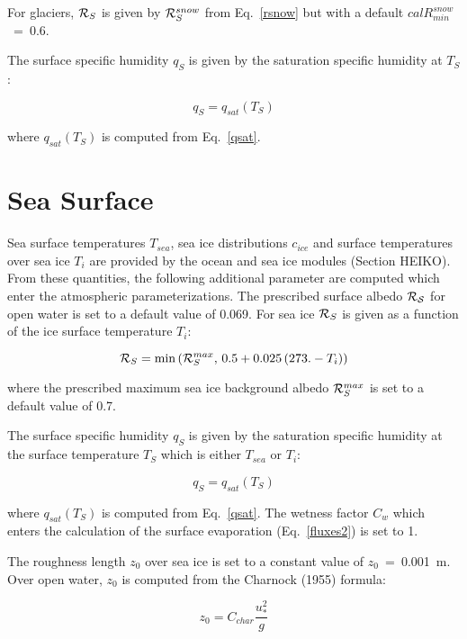 For glaciers, ${\cal R}_S$ is given by ${\cal R}_S^{snow}$ from Eq.~\ref{rsnow} but with a
default 
${cal R}_{min}^{snow}$~=~0.6.

The surface specific humidity $q_S$ is given by the saturation specific humidity at $T_S$:

\begin{equation}
q_S =q_{sat}(T_S)
\end{equation}

where $q_{sat}(T_S)$ is computed from
Eq.~\ref{qsat}. 

\section{Sea Surface}\label{seasurf}

Sea surface temperatures $T_{sea}$, sea  ice distributions
$c_{ice}$ and surface temperatures over
sea ice $T_i$ are provided by the ocean and sea
ice modules (Section HEIKO). From
these quantities, the following additional parameter are
computed which enter the atmospheric
parameterizations. The prescribed surface albedo ${\cal R_S}$
for open water is set to a default value of
0.069. For sea ice ${\cal R}_S$  is given as a function of the ice
surface temperature $T_{i}$:

\begin{equation}
{\cal R}_S=\min{({\cal R}_S^{max}, \, 0.5 + 0.025 \, (273. - T_{i}))} 
\end{equation} 

where the prescribed maximum sea ice background
albedo ${\cal R}_S^{max}$ is set to a default value
of  0.7. 

The surface
specific humidity $q_S$ is given by the
saturation specific humidity at the surface
temperature $T_S$ which is either $T_{sea}$ or
$T_{i}$:

\begin{equation}
q_S =q_{sat}(T_S)
\end{equation}

where $q_{sat}(T_S)$ is computed from
Eq.~\ref{qsat}.  The wetness factor $C_w$ which
enters
the calculation of the surface evaporation
(Eq.~\ref{fluxes2}) is set to 1. 
 
The roughness length $z_0$  over sea ice is set to a
constant value of  $z_0$~=~0.001~m. Over open
water,
$z_0$ is computed from the Charnock (1955) formula:

\begin{equation}
z_0 = C_{char} \frac{u_{*}^{2}}{g}
\end{equation}

